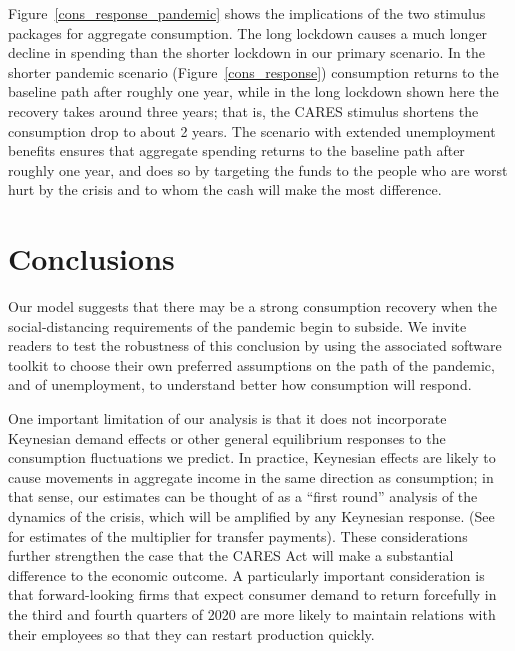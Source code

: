 \documentclass[titlepage]{\econtex}
\begin{document}
Figure~\ref{cons_response_pandemic} shows the implications of the two stimulus packages for aggregate consumption. 
The long lockdown causes a much longer decline in spending than the shorter lockdown in our primary scenario. In the shorter pandemic scenario (Figure~\ref{cons_response}) consumption returns to the baseline path after roughly one year, while in the long lockdown shown here the recovery takes around three years; that is,
the CARES stimulus shortens the consumption drop to about 2 years.
The scenario with extended unemployment benefits ensures that aggregate spending returns to the baseline path after roughly one year, and does so by targeting the funds to the people who are worst hurt by the crisis and to whom the cash will make the most difference.  

\section{Conclusions}

Our model suggests that there may be a strong consumption recovery when the social-distancing requirements of the pandemic begin to subside.
We invite readers to test the robustness of this conclusion by using the associated software toolkit to choose their own preferred assumptions on the path of the pandemic, and of unemployment, to understand better how consumption will respond.

One important limitation of our analysis is that it does not incorporate Keynesian demand effects or other general equilibrium responses to the consumption fluctuations we predict.
In practice, Keynesian effects are likely to cause movements in aggregate income in the same direction as consumption; in that sense, our estimates can be thought of as a ``first round'' analysis of the dynamics of the crisis, which will be amplified by any Keynesian response.  (See \cite{bayer_corona} for estimates of the multiplier for transfer payments).  
These considerations further strengthen the case that the CARES Act will make a substantial difference to the economic outcome.
A particularly important consideration is that forward-looking firms that expect consumer demand to return forcefully in the third and fourth quarters of 2020 are more likely to maintain relations with their employees so that they can restart production quickly.
\end{document}
